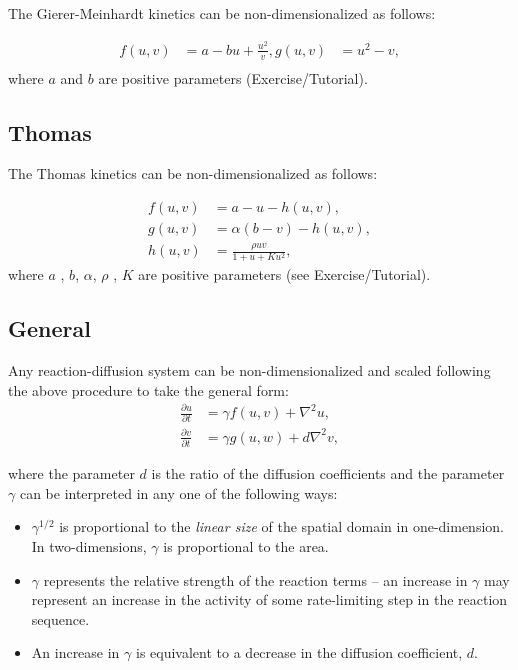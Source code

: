 \documentclass[
  letterpaper,
  DIV=11,
  numbers=noendperiod]{scrreprt}
\providecommand{\tightlist}{%
  \setlength{\itemsep}{0pt}\setlength{\parskip}{0pt}}\usepackage{longtable,booktabs,array}
\theoremstyle{plain}
\theoremstyle{definition}
\theoremstyle{plain}
\theoremstyle{remark}
\begin{document}
The Gierer-Meinhardt kinetics can be non-dimensionalized as follows:

\[
\begin{aligned}
f(u, v) & =  a - b u + \frac{u^2}{v}, 
g(u,v) &= u^2 - v, \\
\end{aligned}
\] where \(a\) and \(b\) are positive parameters (Exercise/Tutorial).

\hypertarget{thomas}{%
\subsection{Thomas}\label{thomas}}

The Thomas kinetics can be non-dimensionalized as follows:

\[
\begin{aligned}
f(u,v) & =  a - u - h(u,v), \\
g(u,v) &= \alpha (b - v) - h(u,v), \\
h(u,v) & =  \frac{\rho u v}{1 + u + K u^2},
\end{aligned}
\] where \(a\) , \(b\), \(\alpha\), \(\rho\) , \(K\) are positive
parameters (see Exercise/Tutorial).

\hypertarget{general}{%
\subsection{General}\label{general}}

Any reaction-diffusion system can be non-dimensionalized and scaled
following the above procedure to take the general form: \[
\begin{aligned}
\frac{\partial u}{\partial  t} & = \gamma f(u,v)  + \nabla^2 u, \\
\frac{\partial v}{\partial  t} & = \gamma g(u,w)  + d \nabla^2 v, 
\end{aligned}
\]

where the parameter \(d\) is the ratio of the diffusion coefficients and
the parameter \(\gamma\) can be interpreted in any one of the following
ways:

\begin{itemize}
\tightlist
\item
  \(\gamma^{1/2}\) is proportional to the \emph{linear size} of the
  spatial domain in one-dimension. In two-dimensions, \(\gamma\) is
  proportional to the area.
\item
  \(\gamma\) represents the relative strength of the reaction terms --
  an increase in \(\gamma\) may represent an increase in the activity of
  some rate-limiting step in the reaction sequence.
\item
  An increase in \(\gamma\) is equivalent to a decrease in the diffusion
  coefficient, \(d\).
\end{itemize}
\end{document}

